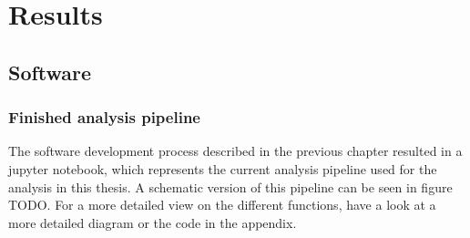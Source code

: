 \chapter{Results}

\section{Software}
\subsection{Finished analysis pipeline}
The software development process described in the previous chapter resulted in a jupyter notebook, which represents the current analysis pipeline used for the analysis in this thesis. A schematic version of this pipeline can be seen in figure TODO. For a more detailed view on the different functions, have a look at a more detailed diagram or the code in the appendix. 

